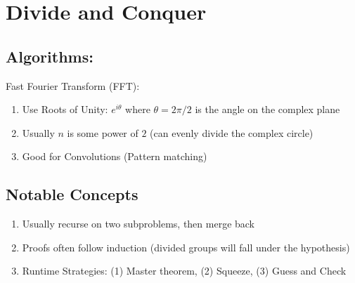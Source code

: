 
\section[Divide and Conquer -- {\it First Lectures SP23}]{Divide and Conquer}

\subsection{Algorithms: }

Fast Fourier Transform (FFT):

\begin{enumerate}
    \item Use Roots of Unity: $e^{i \theta}$ where $\theta = 2 \pi / 2$ is the angle on the complex plane
    \item Usually $n$ is some power of $2$ (can evenly divide the complex circle)
    \item Good for Convolutions (Pattern matching)
\end{enumerate}

\subsection{Notable Concepts}

\begin{enumerate}
    \item Usually recurse on two subproblems, then merge back
    \item Proofs often follow induction (divided groups will fall under the hypothesis)
    \item Runtime Strategies: (1) Master theorem, (2) Squeeze, (3) Guess and Check
    
\end{enumerate}


